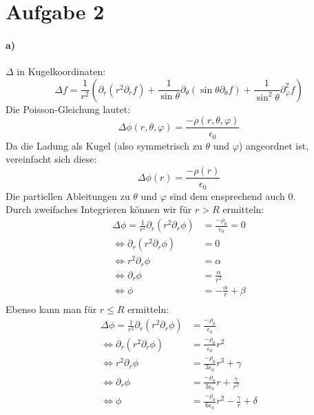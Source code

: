 \documentclass{article}
\newcommand{\delr}{\partial_r}
\newcommand{\deltheta}{\partial_\theta}
\newcommand{\delphi}{\partial_\varphi}
\newcommand{\epsz}{\epsilon_0}
\begin{document}
\section*{Aufgabe 2}
\paragraph{a)}
$\Delta$ in Kugelkoordinaten:
\[
	\Delta f = \frac 1 {r^2}(
	\delr ( r^2 \delr f) +
	\frac 1 {\sin\theta} \deltheta (\sin\theta \deltheta f) +
	\frac 1 {\sin^2\theta} \delphi^2f)
\]
Die Poisson-Gleichung lautet:
\[
	\Delta \phi(r,\theta,\varphi) = \frac{-\rho(r,\theta,\varphi)}
	{\epsilon_0}
\]
Da die Ladung als Kugel (also symmetrisch zu $\theta$ und $\varphi$) 
angeordnet ist, vereinfacht sich diese:
\[
	\Delta \phi(r) = \frac{-\rho(r)}{\epsilon_0}
\]
Die partiellen Ableitungen zu $\theta$ und $\varphi$ sind dem ensprechend 
auch 0. \\
Durch zweifaches Integrieren können wir für $r > R$ ermitteln:
\begin{align*}
	\Delta \phi = 
	\frac 1 {r^2} \delr \left(r^2 \delr \phi \right) 
	&= \frac{- \rho_0}{\epsz} = 0\\
	\Leftrightarrow
	\delr \left( r^2 \delr \phi \right) &= 0 \\
	\Leftrightarrow
	r^2 \delr \phi  &= \alpha \\
	\Leftrightarrow
	\delr \phi  &= \frac{\alpha}{r^2} \\
	\Leftrightarrow
	\phi  &= -\frac{\alpha}{r} + \beta\\
\end{align*}
Ebenso kann man für $r \leq R$ ermitteln:
\begin{align*}
	\Delta \phi = 
	\frac 1 {r^2} \delr \left(r^2 \delr \phi \right) 
	&= \frac{- \rho_0}{\epsz} \\
	\Leftrightarrow
	\delr \left( r^2 \delr \phi \right) 
	&= \frac{- \rho_0 }{\epsz} r^2  \\
	\Leftrightarrow
	r^2 \delr \phi
	&= \frac{- \rho_0 }{3  \epsz} r^3 + \gamma \\
	\Leftrightarrow
	\delr \phi
	&= \frac{- \rho_0 }{3  \epsz} r + \frac \gamma {r^2} \\
	\Leftrightarrow
	\phi
	&= \frac{- \rho_0 }{6  \epsz} r^2 - \frac \gamma r + \delta \\
\end{align*}
\end{document}
